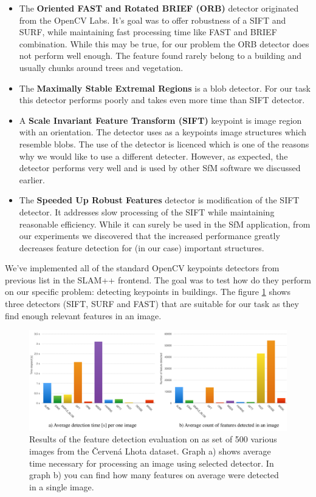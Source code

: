 \begin{itemize}
	\item The \textbf{Oriented FAST and Rotated BRIEF (ORB)} detector originated from the OpenCV Labs. It's goal was to offer robustness of a SIFT and SURF, while maintaining fast processing time like FAST and BRIEF combination. While this may be true, for our problem the ORB detector does not perform well enough. The feature found rarely belong to a building and usually chunks around trees and vegetation. \cite{www:orb}\cite{article:orb}
	
	\item The \textbf{Maximally Stable Extremal Regions} is a blob detector. For our task this detector performs poorly and takes even more time than SIFT detector.
	
	\item A \textbf{Scale Invariant Feature Transform (SIFT)} keypoint is image region with an orientation. The detector uses as a keypoints image structures  which resemble blobs. The use of the detector is licenced which is one of the reasons why we would like to use a different detecter. However, as expected, the detector performs very well and is used by other SfM software we discussed earlier. \cite{article:sift}
	
	\item The \textbf{Speeded Up Robust Features} detector is modification of the SIFT detector. It addresses slow processing of the SIFT while maintaining reasonable efficiency. While it can surely be used in the SfM application, from our experiments we discovered that the increased performance greatly decreases feature detection for (in our case) important structures.  \cite{www:surf}
\end{itemize}

We've implemented all of the standard OpenCV keypoints detectors from previous list in the SLAM++ frontend. The goal was to test how do they perform on our specific problem: detecting keypoints in buildings. The figure \ref{fig:detectors} shows three detectors (SIFT, SURF and FAST) that are suitable for our task as they find enough relevant features in an image. 

\begin{figure}[ht]
	\begin{center}
		\includegraphics[keepaspectratio,width=\textwidth]{fig/detectors.pdf}
	\end{center}
	\caption{Results of the feature detection evaluation on as set of 500 various images from the Červená Lhota dataset. Graph a) shows average time necessary for processing an image using selected detector. In graph b) you can find how many features on average were detected in a single image.}
	\label{fig:detectors}
\end{figure}

